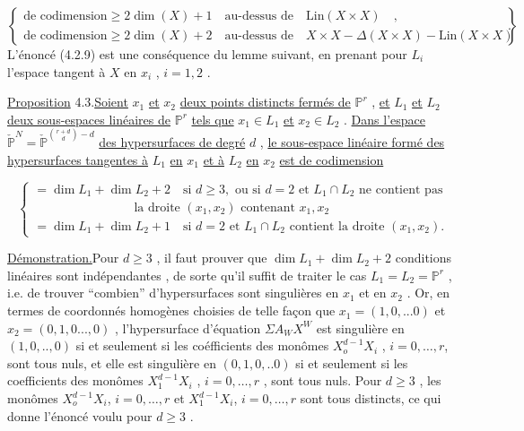\begin{equation}\tag{4.2.9}
\left\{
\begin{array}{l}
\mbox{de codimension} \geq 2\dim(X)+1 \quad \mbox{au-dessus de} \quad \mathrm{Lin}(X{\times}X) \quad , \\[2ex]
\mbox{de codimension} \geq 2\dim(X)+2 \quad \mbox{au-dessus de} \quad X{\times}X-\Delta(X{\times}X)-\mathrm{Lin}(X{\times}X)
\end{array}
\right\} \quad .
\end{equation}
L'énoncé (4.2.9) est une conséquence du lemme suivant, en prenant pour $L_i$ l'espace tangent à $X$ en $x_i$ , $i=1,2$ .

\underline{Proposition} 4.3.\quad \underline{Soient} $x_1$ \underline{et} $x_2$ \underline{deux points distincts fermés de} $\mathbb{P}^r$ , \underline{et} $L_1$ \underline{et} $L_2$ \underline{deux sous-espaces linéaires de} $\mathbb{P}^r$ \underline{tels que} $x_1 \in L_1$ \underline{et} $x_2 \in L_2$ . \underline{Dans l'espace} $\check{\mathbb{P}}^N = \check{\mathbb{P}}^{\binom{r+d}{d}-d}$ \underline{des hypersurfaces de degré} $d$ , \underline{le sous-espace linéaire formé des hypersurfaces tangentes à} $L_1$ \underline{en} $x_1$ \underline{et à} $L_2$ \underline{en} $x_2$ \underline{est de codimension}

\begin{equation*}
\left\{
\begin{array}{l}
= \dim L_1+\dim L_2+2 \quad \mbox{si } d\geq 3, \mbox{ ou si } d=2 \mbox{ et } L_1 \cap L_2 \mbox{ ne contient pas} \\[1ex]
\qquad\qquad\qquad\qquad \mbox{la droite } (x_1,x_2) \mbox{ contenant } x_1,x_2 \\[2ex]
= \dim L_1+\dim L_2+1 \quad \mbox{si } d=2 \mbox{ et } L_1 \cap L_2 \mbox{ contient la droite } (x_1,x_2).
\end{array}
\right.
\end{equation*}


\underline{Démonstration.}\quad Pour $d \geq 3$ , il faut prouver que $\dim L_1 + \dim L_2+2$ conditions linéaires sont indépendantes , de sorte qu'il suffit de traiter le cas $L_1 = L_2 = \mathbb{P}^r$ , i.e. de trouver ``combien'' d'hypersurfaces sont singulières en $x_1$ et en $x_2$ . Or, en termes de coordonnés homogènes choisies de telle façon que $x_1 = (1,0,...0)$ et $x_2 = (0,1,0...,0)$ , l'hypersurface d'équation $\Sigma A_W X^W$ est singulière en $(1,0,..,0)$ si et seulement si les coéfficients des monômes $X_o^{d-1}X_i$ , $i=0,\ldots,r$, sont tous nuls, et elle est singulière en $(0,1,0,..0)$ si et seulement si les coefficients des monômes $X_1^{d-1}X_i$ , $i=0,\ldots,r$ , sont tous nuls. Pour $d \geq 3$ , les monômes $X_o^{d-1}X_i$, $i=0,\ldots,r$ et $X_1^{d-1}X_i$, $i=0,\ldots,r$ sont tous distincts, ce qui donne l'énoncé voulu pour $d \geq 3$ .

